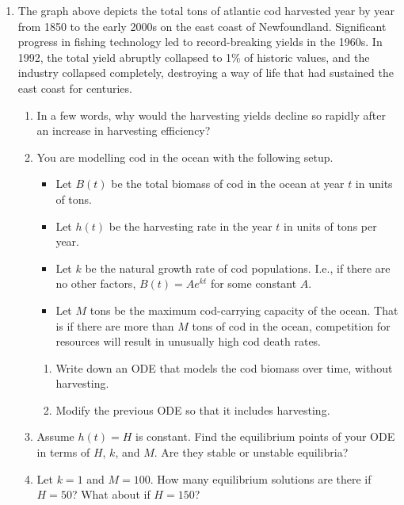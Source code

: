 \begin{enumerate}
\raggedright 

\item The graph above depicts the total tons of atlantic cod harvested  year by year from 1850 to the early 2000s on the east coast of Newfoundland. Significant progress in fishing technology led to record-breaking yields in the 1960s. In 1992, the total yield abruptly collapsed to 1\% of historic values, and the industry collapsed completely, destroying a way of life that had sustained the east coast for centuries.
\begin{enumerate}

\item In a few words, why would the harvesting yields decline so rapidly after an increase in harvesting efficiency?


\item You are modelling cod in the ocean with the following setup.
\begin{itemize}
 	\item Let $B(t)$ be the total biomass of cod in the ocean at year $t$ in units of tons.

	\item 
	Let $h(t)$ be the harvesting rate in the year $t$ in units of tons per year.
	\item Let $k$ be the natural growth rate of cod populations. I.e., if there are no other factors, $B(t)=Ae^{kt}$ for some constant $A$. 
	
	\item Let $M$ tons be the maximum cod-carrying capacity of the ocean. That is if there are more than $M$ tons of cod in the ocean, competition for resources will result in unusually high cod death rates.
\end{itemize}

\begin{enumerate}
    \item Write down an ODE that models the cod biomass over time, without harvesting.
    \item Modify the previous ODE so that it includes harvesting.
\end{enumerate}

\item  Assume $h(t)=H$ is constant. Find the equilibrium points of your ODE in terms of $H$, $k$, and $M$. Are they stable or unstable equilibria?

\item Let $k=1$ and $M=100$. How many equilibrium solutions are there if $H=50$? What about if $H=150$?


\end{enumerate}
\end{enumerate}
